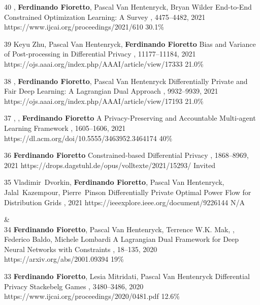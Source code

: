 \begin{pubs}
	\confentry 
	{40} %
	{, {\bf Ferdinando Fioretto}, Pascal Van Hentenryck, Bryan Wilder}
	{End-to-End Constrained Optimization Learning: A Survey}
	{\procIJCAI, 4475--4482, 2021}
	{https://www.ijcai.org/proceedings/2021/610}
	{30.1\%}

	\confentry 
	{39} %
	{Keyu Zhu, Pascal Van Hentenryck, {\bf Ferdinando Fioretto}}
	{Bias and Variance of Post-processing in Differential Privacy}
	{\procAAAI, 11177--11184, 2021}
	{https://ojs.aaai.org/index.php/AAAI/article/view/17333}
    {21.0\%} %

	\confentry 
	{38} %
	{, {\bf Ferdinando Fioretto}, Pascal Van Hentenryck}
	{Differentially Private and Fair Deep Learning: A Lagrangian Dual Approach}
	{\procAAAI, 9932--9939, 2021}
	{https://ojs.aaai.org/index.php/AAAI/article/view/17193}
    {21.0\%} %

    \confentry
    {37} %
    {, , {\bf Ferdinando Fioretto}}
    {A Privacy-Preserving and Accountable Multi-agent Learning Framework}
    {\procAAMAS, 1605--1606, 2021}
    {https://dl.acm.org/doi/10.5555/3463952.3464174}
    {40\%}

	\confentry
	{36} %
	{\bf Ferdinando Fioretto}
	{Constrained-based Differential Privacy}
	{\procCP, 1868--8969, 2021}
	{https://drops.dagstuhl.de/opus/volltexte/2021/15293/}
	{Invited}
	
	\confentry 
	{35} %
	{Vladimir~Dvorkin, {\bf Ferdinando Fioretto}, Pascal Van Hentenryck, Jalal~Kazempour, Pierre~Pinson}
	{Differentially Private Optimal Power Flow for Distribution Grids}
	{, 2021}
	{https://ieeexplore.ieee.org/document/9226144}
	{N/A} %

{}&\nemph{\rule{0.5\linewidth}{0.5pt}}\\[1em]
	\confentry
		{34} %
		{{\bf Ferdinando Fioretto}, Pascal Van Hentenryck, Terrence W.K. Mak, , Federico Baldo, Michele Lombardi} 
		{A Lagrangian Dual Framework for Deep Neural Networks with Constraints}
		{\procECML, 18--135, 2020}
		{https://arxiv.org/abs/2001.09394}
		{19\%}

	\confentry
		{33} %
		{{\bf Ferdinando Fioretto}, Lesia Mitridati, Pascal Van Hentenryck}
		{Differential Privacy Stackebelg Games}
		{\procIJCAI, 3480--3486, 2020}
		{https://www.ijcai.org/proceedings/2020/0481.pdf}
	    {12.6\%}


\end{pubs}
